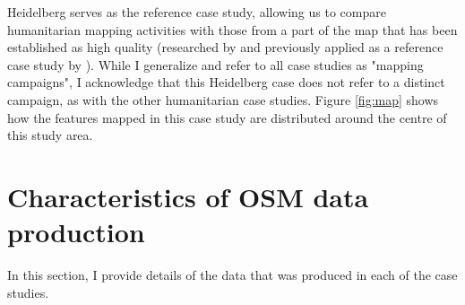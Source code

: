 Heidelberg serves as the reference case study, allowing us to compare humanitarian mapping activities with those from a part of the map that has been established as high quality (researched by \textcite{arsanjani_assessing_2013} and previously applied as a reference case study by \textcite{anderson_crowd_2018}). While I generalize and refer to all case studies as "mapping campaigns", I acknowledge that this Heidelberg case does not refer to a distinct campaign, as with the other humanitarian case studies. Figure \ref{fig:map} shows how the features mapped in this case study are distributed around the centre of this study area.

\section{Characteristics of OSM data production}

In this section, I provide details of the data that was produced in each of the case studies.

